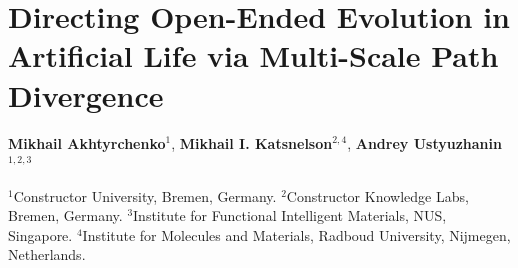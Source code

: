 \documentclass[
  11pt,
]{article}
\author{}
\date{}
\begin{document}
%
%
%
%
%

\section{Directing Open-Ended Evolution in Artificial Life via
Multi-Scale Path Divergence}\label{directing-open-ended-evolution-in-artificial-life-via-multi-scale-path-divergence}

\textbf{Mikhail Akhtyrchenko}\(^{1}\), \textbf{Mikhail I.
Katsnelson}\(^{2,4}\), \textbf{Andrey Ustyuzhanin}\(^{1,2,3}\)

\(^1\)Constructor University, Bremen, Germany. \(^2\)Constructor
Knowledge Labs, Bremen, Germany. \(^3\)Institute for Functional
Intelligent Materials, NUS, Singapore. \(^4\)Institute for Molecules and
Materials, Radboud University, Nijmegen, Netherlands.
\end{document}
